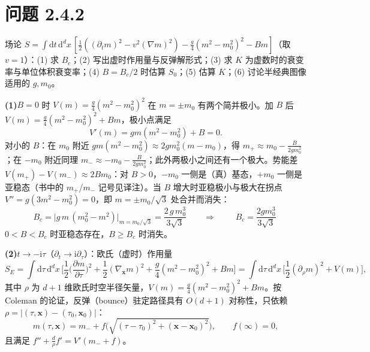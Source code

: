 \section*{问题 2.4.2}
\begin{problem}
场论 $S=\int\mathrm{d}t\,\mathrm{d}^dx\,[\frac12((\partial_tm)^2-v^2(\nabla m)^2)-\frac g4(m^2-m_0^2)^2-Bm]$（取 $v=1$）：(1) 求 $B_c$；(2) 写出虚时作用量与反弹解形式；(3) 求 $K$ 为虚数时的衰变率与单位体积衰变率；(4) $B=B_c/2$ 时估算 $S_0$；(5) 估算 $K$；(6) 讨论半经典图像适用的 $g,m_0$。
\end{problem}
\solution
\textbf{(1)}$B=0$ 时 $V(m)=\frac g4(m^2-m_0^2)^2$ 在 $m=\pm m_0$ 有两个简并极小。加 $B$ 后 $V(m)=\frac g4(m^2-m_0^2)^2+Bm$，极小点满足
\begin{equation*}
V'(m)=gm(m^2-m_0^2)+B=0 .
\end{equation*}
对小的 $B$：在 $m_0$ 附近 $gm(m^2-m_0^2)\approx2gm_0^2(m-m_0)$，得 $m_+\approx m_0-\frac{B}{2gm_0^2}$；在 $-m_0$ 附近同理 $m_-\approx-m_0-\frac{B}{2gm_0^2}$；此外两极小之间还有一个极大。势能差 $V(m_+)-V(m_-)\approx2Bm_0$：对 $B>0$，$-m_0$ 一侧是（真）基态，$+m_0$ 一侧是亚稳态（书中的 $m_+$/$m_-$ 记号见译注）。当 $B$ 增大时亚稳极小与极大在拐点 $V''=g(3m^2-m_0^2)=0$，即 $m=\pm m_0/\sqrt3$ 处合并而消失：
\begin{equation*}
B_c=\big|g\,m\,(m_0^2-m^2)\big|_{m=m_0/\sqrt3}
=\frac{2\,g\,m_0^3}{3\sqrt3}
\qquad\Longrightarrow\qquad
\boxed{\;B_c=\frac{2gm_0^3}{3\sqrt3}\;}
\end{equation*}
$0<B<B_c$ 时亚稳态存在，$B\ge B_c$ 时消失。

\textbf{(2)}$t\to-\mathrm{i}\tau$（$\partial_t\to\mathrm{i}\partial_\tau$）：欧氏（虚时）作用量
\begin{equation*}
S_E=\int\mathrm{d}\tau\,\mathrm{d}^dx\,
\Big[\frac12\Big(\frac{\partial m}{\partial\tau}\Big)^2+\frac12(\nabla_{\pmb x}m)^2
+\frac g4(m^2-m_0^2)^2+Bm\Big]
=\int\mathrm{d}\tau\,\mathrm{d}^dx\,\Big[\frac12(\partial_\rho m)^2+V(m)\Big],
\end{equation*}
其中 $\rho$ 为 $d+1$ 维欧氏时空半径矢量，$V(m)=\frac g4(m^2-m_0^2)^2+Bm$。按 Coleman 的论证，反弹（bounce）驻定路径具有 $O(d+1)$ 对称性，只依赖 $\rho=|(\tau,\pmb x)-(\tau_0,\pmb x_0)|$：
\begin{equation*}
m(\tau,\pmb x)=m_-+f\big(\sqrt{(\tau-\tau_0)^2+(\pmb x-\pmb x_0)^2}\big),\qquad f(\infty)=0,
\end{equation*}
且满足 $f''+\frac{d}{\rho}f'=V'(m_-+f)$。

